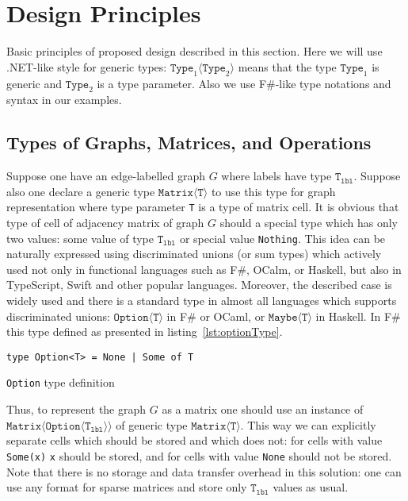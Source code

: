 \section{Design Principles}

Basic principles of proposed design described in this section.
Here we will use .NET-like style for generic types: $\texttt{Type}_1\langle\texttt{Type}_2\rangle$ means that the type $\texttt{Type}_1$ is generic and $\texttt{Type}_2$ is a type parameter.
Also we use F\#-like type notations and syntax in our examples.

\subsection{Types of Graphs, Matrices, and Operations}

Suppose one have an edge-labelled graph $G$ where labels have type $\texttt{T}_{\texttt{lbl}}$. 
Suppose also one declare a generic type $\texttt{Matrix} \langle \texttt{T} \rangle$ to use this type for graph representation where type parameter \texttt{T} is a type of matrix cell. 
It is obvious that type of cell of adjacency matrix of graph $G$ should a special type which has only two values: some value of type $\texttt{T}_{\texttt{lbl}}$ or special value \texttt{Nothing}.
This idea can be naturally expressed using discriminated unions (or sum types) which actively used not only in functional languages such as F\#, OCalm, or Haskell, but also in TypeScript, Swift and other popular languages. 
Moreover, the described case is widely used and there is a standard type in almost all languages which supports discriminated unions: $\texttt{Option} \langle \texttt{T} \rangle$ in F\# or OCaml, or $\texttt{Maybe} \langle \texttt{T} \rangle$ in Haskell. 
In F\# this type defined as presented in listing~\ref{lst:optionType}.

\begin{listing}[h]
\begin{verbatim}
type Option<T> = None | Some of T
\end{verbatim}
\caption{\texttt{Option} type definition}
\label{lst:optionType}
\end{listing}


Thus, to represent the graph $G$ as a matrix one should use an instance of $\texttt{Matrix} \langle \texttt{Option}\langle \texttt{T}_{\texttt{lbl}} \rangle \rangle $  of generic type $\texttt{Matrix}\langle \texttt{T} \rangle$.
This way we can explicitly separate cells which should be stored and which does not: for cells with value \texttt{Some(x)} \texttt{x} should be stored, and for cells with value \texttt{None} should not be stored. Note that there is no storage and data transfer overhead in this solution: one can use any format for sparse matrices and store only $\texttt{T}_{\texttt{lbl}}$ values as usual.

